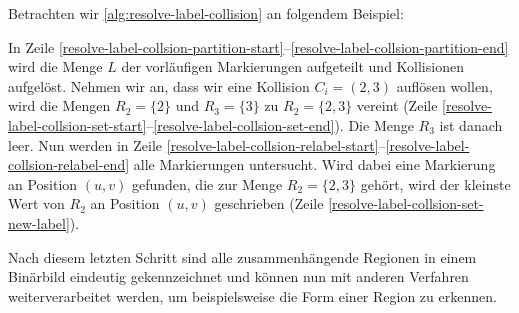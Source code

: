 Betrachten wir \autoref{alg:resolve-label-collision} an folgendem Beispiel:

In Zeile \ref{resolve-label-collsion-partition-start}--\ref{resolve-label-collsion-partition-end} wird die Menge $L$
 der vorläufigen Markierungen aufgeteilt und Kollisionen aufgelöst. Nehmen wir an, dass wir eine Kollision
 $C_i = (2,3)$ auflösen wollen, wird die Mengen $R_2 = \{2\}$ und $R_3 = \{3\}$  zu $R_2 = \{2,3\}$ vereint
 (Zeile \ref{resolve-label-collsion-set-start}--\ref{resolve-label-collsion-set-end}). Die Menge $R_3$ ist danach leer.
 Nun werden in Zeile \ref{resolve-label-collsion-relabel-start}--\ref{resolve-label-collsion-relabel-end} alle
 Markierungen untersucht. Wird dabei eine Markierung an Position $(u,v)$ gefunden, die zur Menge $R_2 = \{2,3\}$ gehört,
 wird der kleinste Wert von $R_2$ an Position $(u,v)$ geschrieben (Zeile \ref{resolve-label-collsion-set-new-label}).

Nach diesem letzten Schritt sind alle zusammenhängende Regionen in einem Binärbild eindeutig gekennzeichnet und können
 nun mit anderen Verfahren weiterverarbeitet werden, um beispielsweise die Form einer Region zu erkennen.



